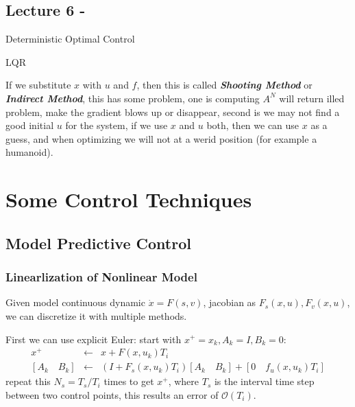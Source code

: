 \documentclass[10pt]{elegantbook}
\newcommand{\mydefination}[1]{\textbf{\textit{\textcolor{structurecolor}{#1}}}}
\begin{document}
\section{Lecture 6 - }

\begin{introduction}
    \item Deterministic Optimal Control
    \item LQR
\end{introduction}

If we substitute $x$ with $u$ and $f$, then this is called \mydefination{Shooting Method} or \mydefination{Indirect Method},
this has some problem, one is computing $A^N$ will return illed problem, make the gradient blows up or disappear, second is
we may not find a good initial $u$ for the system, if we use $x$ and $u$ both, then we can use $x$ as a guess, and when
optimizing we will not at a werid position (for example a humanoid).

\chapter{Some Control Techniques}

\section{Model Predictive Control}

\subsection{Linearlization of Nonlinear Model}

Given model continuous dynamic $\dot x = F(s, v)$, jacobian as $F_s(x, u), F_v(x, u)$, we can discretize it with multiple methods.

First we can use explicit Euler: start with $x^{+} = x_k, A_k = I, B_k = 0$:
\begin{equation}
\begin{array}{rll}
    x^{+} & \leftarrow & x + F(x, u_k) T_i \\
    \left[ A_k \quad B_k \right] & \leftarrow & \left( I + F_s(x, u_k) T_i \right) \left[ A_k \quad B_k \right] + \left[ 0 \quad f_u(x, u_k) T_i \right]
\end{array}
\end{equation}
repeat this $N_s = T_s / T_i$ times to get $x^{+}$, where $T_s$ is the interval time step between two control points,
this results an error of $\mathcal O(T_i)$.
\end{document}
